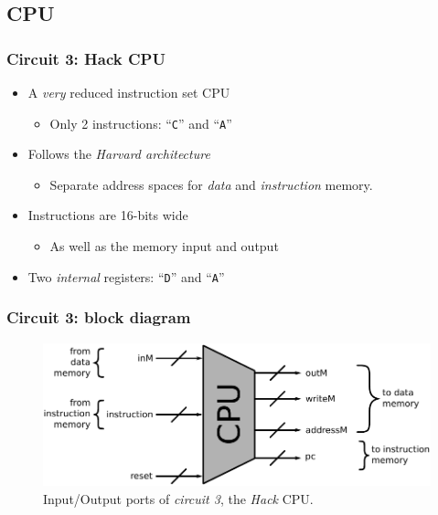     \subsection{CPU}
    \label{subsec:cpu}
        \begin{frame}
            \frametitle{Circuit 3: Hack CPU}

            \begin{itemize}
                \item A \emph{very} reduced instruction set CPU
                    \begin{itemize}
                        \item Only 2 instructions: ``\texttt{C}'' and ``\texttt{A}''
                    \end{itemize}
                \item Follows the \emph{Harvard architecture}
                    \begin{itemize}
                        \item Separate address spaces for \emph{data} and \emph{instruction} memory.
                    \end{itemize}
                \item Instructions are 16-bits wide
                    \begin{itemize}
                        \item As well as the memory input and output
                    \end{itemize}
                \item Two \emph{internal} registers: ``\texttt{D}'' and ``\texttt{A}''
            \end{itemize}
        \end{frame}

        \begin{frame}
            \frametitle{Circuit 3: block diagram}

            \begin{figure}[h!]
                \centerline{\includegraphics[width=1.0\textwidth]{imgs/cpu-block.pdf}}
                \caption{Input/Output ports of \emph{circuit 3}, the \emph{Hack} CPU.
                    \label{fig:cpu-block}}
            \end{figure}
        \end{frame}

